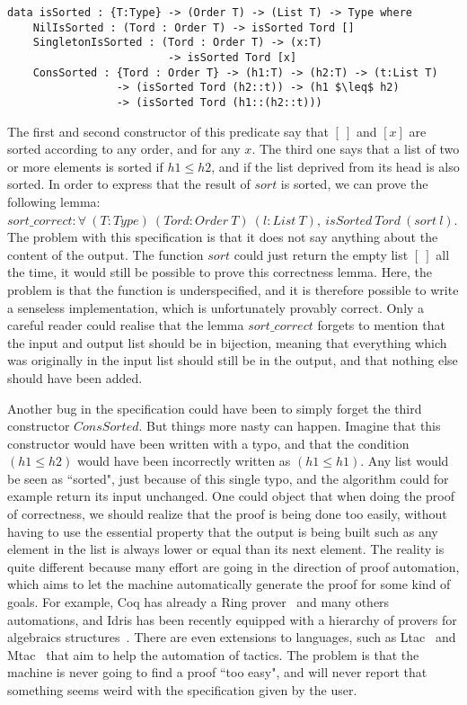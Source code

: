\begin{lstlisting}
data isSorted : {T:Type} -> (Order T) -> (List T) -> Type where
    NilIsSorted : (Tord : Order T) -> isSorted Tord []
    SingletonIsSorted : (Tord : Order T) -> (x:T) 
                         -> isSorted Tord [x]
    ConsSorted : {Tord : Order T} -> (h1:T) -> (h2:T) -> (t:List T) 
                 -> (isSorted Tord (h2::t)) -> (h1 $\leq$ h2) 
                 -> (isSorted Tord (h1::(h2::t)))
\end{lstlisting}
The first and second constructor of this predicate say that $[\ ]$ and $[x]$ are sorted according to any order, and for any $x$. The third one says that a list of two or more elements is sorted if $h1 \le h2$, and if the list deprived from its head is also sorted. In order to express that the result of $sort$ is sorted, we can prove the following lemma:
$sort\_correct : \forall\ (T:Type)\ (Tord:Order\ T)\ (l:List\ T),\ isSorted\ Tord\ (sort\ l)$. The problem with this specification is that it does not say anything about the content of the output. The function $sort$ could just return the empty list $[\ ]$ all the time, it would still be possible to prove this correctness lemma. Here, the problem is that the function is underspecified, and it is therefore possible to write a senseless implementation, which is unfortunately provably correct. Only a careful reader could realise that the lemma $sort\_correct$ forgets to mention that the input and output list should be in bijection, meaning that everything which was originally in the input list should still be in the output, and that nothing else should have been added.

Another bug in the specification could have been to simply forget the third constructor $ConsSorted$. But things more nasty can happen. Imagine that this constructor would have been written with a typo, and that the condition $(h1 \leq h2) $ would have been incorrectly written as $(h1 \leq h1)$. Any list would be seen as ``sorted", just because of this single typo, and the algorithm could for example return its input unchanged. One could object that when doing the proof of correctness, we should realize that the proof is being done too easily, without having to use the essential property that the output is being built such as any element in the list is always lower or equal than its next element. The reality is quite different because many effort are going in the direction of proof automation, which aims to let the machine automatically generate the proof for some kind of goals. For example, Coq has already a Ring prover~\cite{coq2005} and many others automations, and Idris has been recently equipped with a hierarchy of provers for algebraics structures~\cite{Slama2016}. There are even extensions to languages, such as Ltac~\cite{DelahayeLTac} and Mtac~\cite{Ziliani13} that aim to help the automation of tactics. The problem is that the machine is never going to find a proof ``too easy", and will never report that something seems weird with the specification given by the user.

